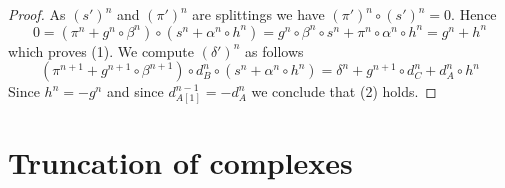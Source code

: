 \begin{proof}
As $(s')^n$ and $(\pi')^n$ are splittings we have $(\pi')^n \circ (s')^n = 0$.
Hence
$$
0 = ( \pi^n + g^n \circ \beta^n ) \circ ( s^n + \alpha^n \circ h^n ) =
g^n \circ \beta^n \circ s^n + \pi^n \circ \alpha^n \circ h^n =
g^n + h^n
$$
which proves (1). We compute $(\delta')^n$ as follows
$$
( \pi^{n + 1} + g^{n + 1} \circ \beta^{n + 1} )
\circ d_B^n \circ
( s^n + \alpha^n \circ h^n )
= \delta^n + g^{n + 1} \circ d_C^n + d_A^n \circ h^n
$$
Since $h^n = -g^n$ and since $d_{A[1]}^{n - 1} = -d_A^n$ we conclude that (2)
holds.
\end{proof}




\section{Truncation of complexes}
\label{section-truncations}

